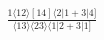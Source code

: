 \documentclass[varwidth, border=5pt]{standalone}
\begin{document}
\begin{my}
$\begin{gathered}
\scriptscriptstyle\frac{1⟨12⟩[14]⟨2|1+3|4]}{⟨13⟩⟨23⟩⟨1|2+3|1]}
\end{gathered}$
\end{my}
\end{document}
